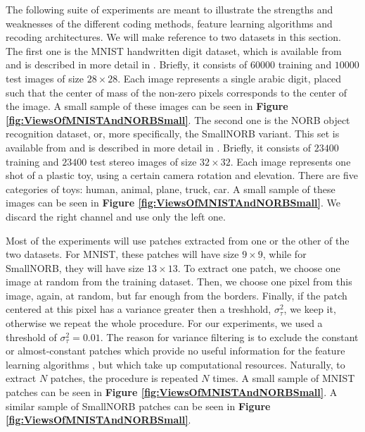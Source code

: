 \documentclass[12pt,a4paper,oneside,english]{UPBThesis}
\newcommand{\hctimes}[2]{{#1}\!\times\!{#2}}
\begin{document}
The following suite of experiments are meant to illustrate the strengths and weaknesses of the different coding methods, feature learning algorithms and recoding architectures. We will make reference to two datasets in this section. The first one is the MNIST handwritten digit dataset, which is available from \cite{mnist-website} and is described in more detail in \cite{gradient-based-learning}. Briefly, it consists of $60000$ training and $10000$ test images of size $\hctimes{28}{28}$. Each image represents a single arabic digit, placed such that the center of mass of the non-zero pixels corresponds to the center of the image. A small sample of these images can be seen in \textbf{Figure \ref{fig:ViewsOfMNISTAndNORBSmall}}. The second one is the NORB object recognition dataset, or, more specifically, the SmallNORB variant. This set is available from \cite{norbsmall-website} and is described in more detail in \cite{learning-methods-invariance-pose-lighting}. Briefly, it consists of $23400$ training and $23400$ test stereo images of size $\hctimes{32}{32}$. Each image represents one shot of a plastic toy, using a certain camera rotation and elevation. There are five categories of toys: human, animal, plane, truck, car. A small sample of these images can be seen in \textbf{Figure \ref{fig:ViewsOfMNISTAndNORBSmall}}. We discard the right channel and use only the left one.

Most of the experiments will use patches extracted from one or the other of the two datasets. For MNIST, these patches will have size $\hctimes{9}{9}$, while for SmallNORB, they will have size $\hctimes{13}{13}$. To extract one patch, we choose one image at random from the training dataset. Then, we choose one pixel from this image, again, at random, but far enough from the borders. Finally, if the patch centered at this pixel has a variance greater then a treshhold, $\sigma^2_\tau$, we keep it, otherwise we repeat the whole procedure. For our experiments, we used a threshold of $\sigma^2_\tau = 0.01$. The reason for variance filtering is to exclude the constant or almost-constant patches which provide no useful information for the feature learning algorithms \cite{simple-method-sparse-coding,tiny-images}, but which take up computational resources. Naturally, to extract $N$ patches, the procedure is repeated $N$ times. A small sample of MNIST patches can be seen in \textbf{Figure \ref{fig:ViewsOfMNISTAndNORBSmall}}. A similar sample of SmallNORB patches can be seen in \textbf{Figure \ref{fig:ViewsOfMNISTAndNORBSmall}}.
\end{document}
